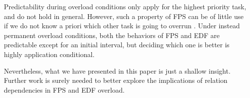 \documentclass{article}
\begin{document}
Predictability during overload conditions only apply for the highest priority task, and do not hold in general. However, such a property of FPS can be of little use if we do not know a priori which other task is going to overrun \cite{buttazzo-rm-edf}. Under instead permanent overload conditions, both the behaviors of FPS and EDF are predictable except for an initial interval, but deciding which one is better is highly application conditional.

Nevertheless, what we have presented in this paper is just a shallow insight. Further work is surely needed to better explore the implications of relation dependencies in FPS and EDF overload.


\end{document}
